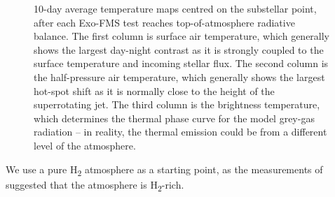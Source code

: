 \begin{figure}
\caption{10-day average temperature maps centred on the substellar point, after each Exo-FMS test reaches top-of-atmosphere radiative balance. The first column is surface air temperature, which generally shows the largest day-night contrast as it is strongly coupled to the surface temperature and incoming stellar flux. The second column is the half-pressure air temperature, which generally shows the largest hot-spot shift as it is normally close to the height of the superrotating jet. The third column is the brightness temperature, which determines the thermal phase curve for the model grey-gas radiation -- in reality, the thermal emission could be from a different level of the atmosphere.\label{fig:allT_results}}
\end{figure}

We use a pure H\textsubscript{2} atmosphere as a starting point, as the measurements of  \citet{tsiaras2016detection} suggested that the atmosphere is H\textsubscript{2}-rich.

